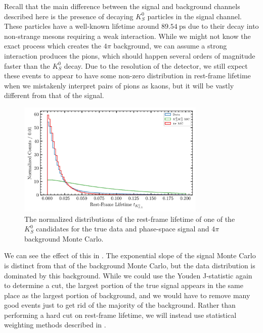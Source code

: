 Recall that the main difference between the signal and background channels described here is the presence of decaying $K_S^0$ particles in the signal channel. These particles have a well-known lifetime around $\SI{89.54}{\pico\second}$ due to their decay into non-strange mesons requiring a weak interaction. While we might not know the exact process which creates the $4\pi$ background, we can assume a strong interaction produces the pions, which should happen several orders of magnitude faster than the $K_S^0$ decay. Due to the resolution of the detector, we still expect these events to appear to have some non-zero distribution in rest-frame lifetime when we mistakenly interpret pairs of pions as kaons, but it will be vastly different from that of the signal.

\begin{figure}
  \begin{center}
    \includegraphics[width=0.8\textwidth]{figures/data_combined_rfl.png}
  \end{center}
  \caption{The normalized distributions of the rest-frame lifetime of one of the $K_S^0$ candidates for the true data and phase-space signal and $4\pi$ background Monte Carlo.}\label{fig:data-combined-rfl}
\end{figure}

We can see the effect of this in . The exponential slope of the signal Monte Carlo is distinct from that of the background Monte Carlo, but the data distribution is dominated by this background. While we could use the Youden J-statistic again to determine a cut, the largest portion of the true signal appears in the same place as the largest portion of background, and we would have to remove many good events just to get rid of the majority of the background. Rather than performing a hard cut on rest-frame lifetime, we will instead use statistical weighting methods described in .

